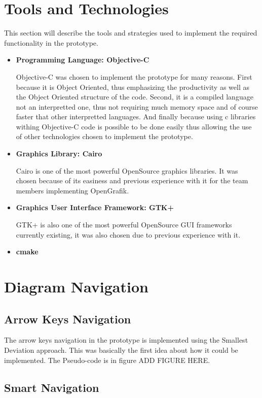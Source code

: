 \section{Tools and Technologies}
This section will describe the tools and strategies used to implement the required functionality in the prototype.
\begin{itemize}
\item {\bf Programming Language: Objective-C}
\par \noindent
Objective-C was chosen to implement the prototype for many reasons. First because it is Object Oriented, thus emphasizing the productivity as well as the Object Oriented structure of the code. Second, it is a compiled language not an interpretted one, thus not requiring much memory space and of course faster that other interpretted languages. And finally because using c libraries withing Objective-C code is possible to be done easily thus allowing the use of other technologies chosen to implement the prototype.

\item {\bf Graphics Library: Cairo}
\par \noindent
Cairo is one of the most powerful OpenSource graphics libraries. It was chosen because of its easiness and previous experience with it for the team members implementing OpenGrafik.

\item {\bf Graphics User Interface Framework: GTK+}
\par \noindent
GTK+ is also one of the most powerful OpenSource GUI frameworks currently existing, it was also chosen due to previous experience with it.

\item {\bf cmake}
\end{itemize}

\section{Diagram Navigation}

\subsection{Arrow Keys Navigation}
The arrow keys navigation in the prototype is implemented using the Smallest Deviation approach. This was basically the first idea about how it could be implemented. The Pseudo-code is in figure ADD FIGURE HERE.

\subsection{Smart Navigation}

